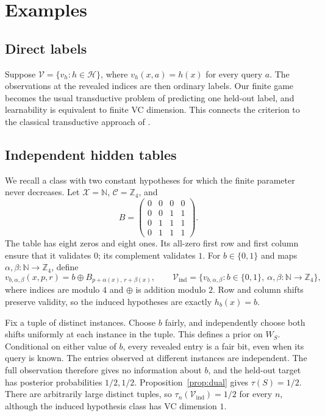 \documentclass[11pt]{article}
\newcommand{\X}{\mathcal X}
\newcommand{\C}{\mathcal C}
\newcommand{\V}{\mathcal V}
\newcommand{\Hclass}{\mathcal H}
\begin{document}
\section{Examples}\label{sec:examples}

\subsection{Direct labels}

Suppose $\V=\{v_h:h\in\Hclass\}$, where $v_h(x,a)=h(x)$ for every
query $a$. The observations at the revealed indices are then ordinary
labels. Our finite game becomes the usual transductive problem of
predicting one held-out label, and learnability is equivalent to finite
VC dimension. This connects the criterion to the classical transductive
approach of \citet{haussler1994predicting}.

\subsection{Independent hidden tables}

We recall a class with two constant hypotheses for which the finite
parameter never decreases. Let $\X=\mathbb N$, $\C=\mathbb Z_4$, and
\[
B=\begin{pmatrix}
0&0&0&0\\
0&0&1&1\\
0&1&1&1\\
0&1&1&1
\end{pmatrix}.
\]
The table has eight zeros and eight ones. Its all-zero first row and first
column ensure that it validates $0$; its complement validates $1$.
For $b\in\{0,1\}$ and maps $\alpha,\beta:\mathbb N\to\mathbb Z_4$,
define
\[
v_{b,\alpha,\beta}(x,p,r)
=b\oplus B_{p+\alpha(x),\,r+\beta(x)},
\qquad
\V_{\mathrm{ind}}=
\{v_{b,\alpha,\beta}:b\in\{0,1\},\
  \alpha,\beta:\mathbb N\to\mathbb Z_4\},
\]
where indices are modulo $4$ and $\oplus$ is addition modulo $2$. Row and column shifts
preserve validity, so the induced hypotheses are exactly $h_b(x)=b$.

Fix a tuple of distinct instances. Choose $b$ fairly, and independently
choose both shifts uniformly at each instance in the tuple. This defines
a prior on $W_S$. Conditional on either value of $b$, every revealed entry
is a fair bit, even when its query is known. The entries observed at
different instances are independent. The full observation therefore gives
no information about $b$, and the held-out target has posterior
probabilities $1/2,1/2$. Proposition~\ref{prop:dual} gives $\tau(S)=1/2$.
There are arbitrarily large distinct tuples, so
$\tau_n(\V_{\mathrm{ind}})=1/2$ for every $n$, although the induced
hypothesis class has VC dimension $1$.
\end{document}
